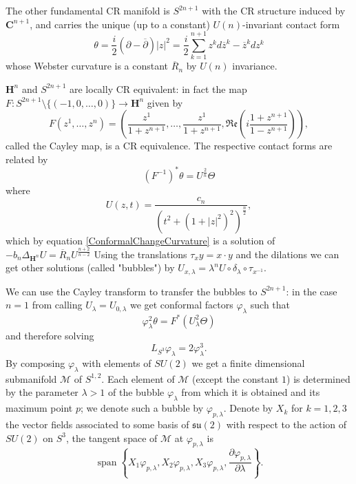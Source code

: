 \documentclass[10pt,a4paper]{amsart}
\renewcommand{\phi}{\varphi}
\newcommand{\de}{\partial}
\newcommand{\C}{\mathbf{C}}
\newcommand{\ci}[1]{\mathscr{#1}}%
\renewcommand{\H}{\mathbf{H}}
\newcommand{\g}[1]{\mathfrak{#1}}
\begin{document}
The other fundamental CR manifold is $S^{2n+1}$ with the CR structure induced by $\C^{n+1}$, and carries the unique (up to a constant) $U(n)$-invariant contact form
$$\theta= \frac{i}{2}(\de-\overline{\de})|z|^2 = \frac{i}{2}\sum_{k=1}^{n+1}z^kd\overline{z}^k-\overline{z}^kdz^k$$
whose Webster curvature is a constant $\overline{R}_n$ by $U(n)$ invariance.

$\H^n$ and $S^{2n+1}$ are locally CR equivalent: in fact the map $F:S^{2n+1}\setminus\{(-1,0,\ldots,0)\}\to\H^n$ given by
$$F(z^1,\ldots,z^n)= \left(\frac{z^1}{1+z^{n+1}},\ldots,\frac{z^1}{1+z^{n+1}},\g{Re}\left(i\frac{1+z^{n+1}}{1-z^{n+1}}\right)\right),$$
called the Cayley map, is a CR equivalence.
The respective contact forms are related by
$$(F^{-1})^*\theta= U^{\frac{2}{n}}\Theta$$
where
$$U(z,t)=\frac{c_n}{\left(t^2+(1+|z|^2)^2\right)^{\frac{n}{2}}},$$
which by equation \eqref{ConformalChangeCurvature} is a solution of $-b_n\Delta_{\H^n}U= \overline{R}_nU^{\frac{n+2}{n-2}}$
Using the translations $\tau_xy=x\cdot y$ and the dilations we can get other solutions (called "bubbles") by $U_{x,\lambda}=\lambda^nU\circ\delta_{\lambda}\circ\tau_{x^{-1}}$.

We can use the Cayley transform to transfer the bubbles to $S^{2n+1}$: in the case $n=1$ from calling $U_{\lambda}=U_{0,\lambda}$ we get conformal factors $\phi_{\lambda}$ such that
$$\phi_{\lambda}^2\theta=F^*(U_{\lambda}^2\Theta)$$
and therefore solving
\begin{equation}
 L_{S^3}\phi_{\lambda}= 2\phi_{\lambda}^3.
\end{equation}
By composing $\phi_{\lambda}$ with elements of $SU(2)$ we get a finite dimensional submanifold $\ci{M}$ of $S^{1,2}$. Each element of $\ci{M}$ (except the constant $1$) is determined by the parameter $\lambda>1$ of the bubble $\phi_{\lambda}$ from which it is obtained and its maximum point $p$; we denote such a bubble by $\phi_{p,\lambda}$. Denote by $X_k$ for $k=1,2,3$ the vector fields associated to some basis of $\g{su}(2)$ with respect to the action of $SU(2)$ on $S^3$, the tangent space of $\ci{M}$ at $\phi_{p,\lambda}$ is
$$\operatorname{span}\left\{X_1\phi_{p,\lambda}, X_2\phi_{p,\lambda},X_3\phi_{p,\lambda},\frac{\de\phi_{p,\lambda}}{\de\lambda}\right\}.$$

\vspace{8mm}
\end{document}
